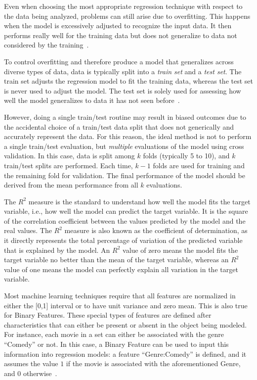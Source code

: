 Even when choosing the most appropriate regression technique with respect to
the data being analyzed, problems can still arise due to overfitting. This
happens when the model is excessively adjusted to recognize the input data. It
then performs really well for the training data but does not generalize to data
not considered by the training~\citep{murphy2012machine}.

To control overfitting and therefore produce a model that generalizes across
diverse types of data, data is typically split into a \textit{train set} and a
\textit{test set}. The train set adjusts the regression model to fit
the training data, whereas the test set is never used to adjust the model. The
test set is solely used for assessing how well the model generalizes to data it
has not seen before~\citep{murphy2012machine}.

However, doing a single train/test routine may result in biased outcomes due to
the accidental choice of a train/test data split that does not generically and
accurately represent the data. For this reason, the ideal method is not to
perform a single train/test evaluation, but \textit{multiple} evaluations of
the model using cross validation. In this case, data is split among $k$ folds
(typically 5 to 10), and $k$ train/test splits are performed. Each time, $k-1$
folds are used for training and the remaining fold for validation. The final
performance of the model should be derived from the mean performance from all
$k$ evaluations.~\citep{murphy2012machine}

The $R^2$ measure is the standard to understand how well the model fits the
target variable, i.e., how well the model can predict the target variable. It
is the square of the correlation coefficient between the values predicted by
the model and the real values. The $R^2$ measure is also known as the
coefficient of determination, as it directly represents the total percentage of
variation of the predicted variable that is explained by the model. An $R^2$
value of zero means the model fits the target variable no better than the mean
of the target variable, whereas an $R^2$ value of one means the model can
perfectly explain all variation in the target variable.

Most machine learning techniques require that all features are normalized in
either the [0,1] interval or to have unit variance and zero mean. This is also
true for Binary Features. These special types of features are defined after
characteristics that can either be present or absent in the object being
modeled. For instance, each movie in a set can either be associated with the
genre ``Comedy'' or not. In this case, a Binary Feature can be used to input
this information into regression models: a feature ``Genre:Comedy'' is defined,
and it assumes the value $1$ if the movie is associated with the aforementioned
Genre, and $0$ otherwise~\citep{murphy2012machine}.
